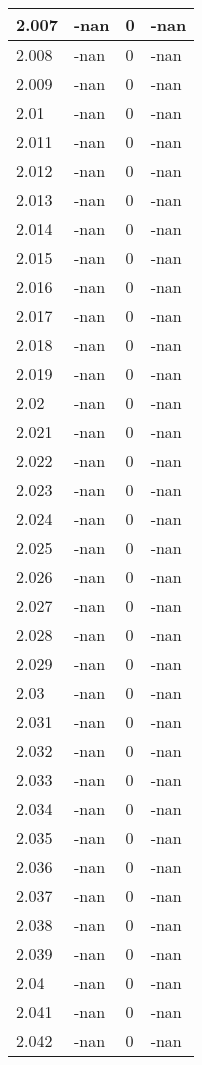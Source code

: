 \documentclass[a4paper,14pt]{extarticle}
\begin{document}
\begin{longtable}{||m{3cm}||m{3cm}|m{3cm}||m{3cm}||}
\hline
2.007 & -nan & 0 & -nan\\
\hline
2.008 & -nan & 0 & -nan\\
\hline
2.009 & -nan & 0 & -nan\\
\hline
2.01 & -nan & 0 & -nan\\
\hline
2.011 & -nan & 0 & -nan\\
\hline
2.012 & -nan & 0 & -nan\\
\hline
2.013 & -nan & 0 & -nan\\
\hline
2.014 & -nan & 0 & -nan\\
\hline
2.015 & -nan & 0 & -nan\\
\hline
2.016 & -nan & 0 & -nan\\
\hline
2.017 & -nan & 0 & -nan\\
\hline
2.018 & -nan & 0 & -nan\\
\hline
2.019 & -nan & 0 & -nan\\
\hline
2.02 & -nan & 0 & -nan\\
\hline
2.021 & -nan & 0 & -nan\\
\hline
2.022 & -nan & 0 & -nan\\
\hline
2.023 & -nan & 0 & -nan\\
\hline
2.024 & -nan & 0 & -nan\\
\hline
2.025 & -nan & 0 & -nan\\
\hline
2.026 & -nan & 0 & -nan\\
\hline
2.027 & -nan & 0 & -nan\\
\hline
2.028 & -nan & 0 & -nan\\
\hline
2.029 & -nan & 0 & -nan\\
\hline
2.03 & -nan & 0 & -nan\\
\hline
2.031 & -nan & 0 & -nan\\
\hline
2.032 & -nan & 0 & -nan\\
\hline
2.033 & -nan & 0 & -nan\\
\hline
2.034 & -nan & 0 & -nan\\
\hline
2.035 & -nan & 0 & -nan\\
\hline
2.036 & -nan & 0 & -nan\\
\hline
2.037 & -nan & 0 & -nan\\
\hline
2.038 & -nan & 0 & -nan\\
\hline
2.039 & -nan & 0 & -nan\\
\hline
2.04 & -nan & 0 & -nan\\
\hline
2.041 & -nan & 0 & -nan\\
\hline
2.042 & -nan & 0 & -nan\\

\end{longtable}
\end{document}
